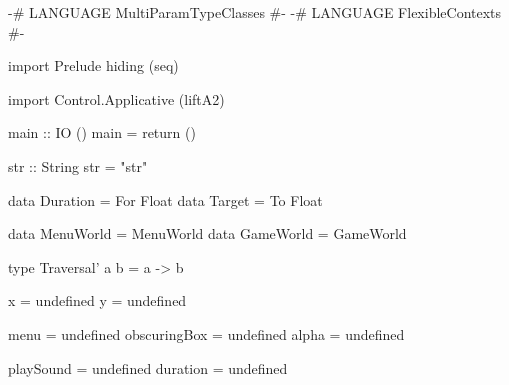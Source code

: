 \begin{code}
{-# LANGUAGE MultiParamTypeClasses #-}
{-# LANGUAGE FlexibleContexts #-}

import Prelude hiding (seq)

import Control.Applicative (liftA2)

main :: IO ()
main = return ()

str :: String
str = "str"

data Duration = For Float
data Target = To Float

data MenuWorld = MenuWorld
data GameWorld = GameWorld

type Traversal' a b = a -> b

x = undefined
y = undefined

menu = undefined
obscuringBox = undefined
alpha = undefined

playSound = undefined
duration = undefined
\end{code}
